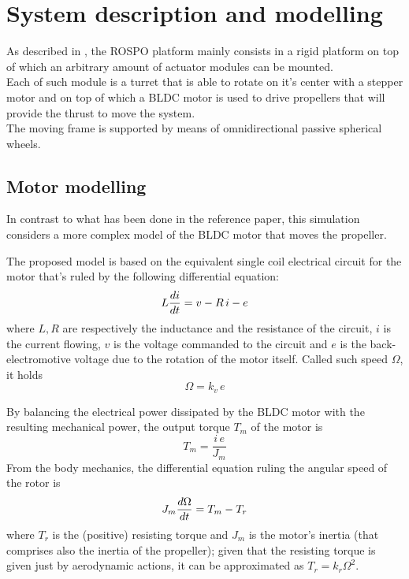\section{System description and modelling} \label{sec:description}

As described in \cite{rospo}, the ROSPO platform mainly consists in a rigid platform on top of which an arbitrary amount of actuator modules can be mounted. \\
Each of such module is a turret that is able to rotate on it's center with a stepper motor and on top of which a BLDC motor is used to drive propellers that will provide the thrust to move the system. \\
The moving frame is supported by means of omnidirectional passive spherical wheels.

\subsection{Motor modelling}
In contrast to what has been done in the reference paper, this simulation considers a more complex model of the BLDC motor that moves the propeller.

The proposed model is based on the equivalent single coil electrical circuit for the motor that's ruled by the following differential equation:
\begin{equation} \label{eq:singlecoil}
    L \diff{i} t = v - R\, i - e
\end{equation}
where $L, R$ are respectively the inductance and the resistance of the circuit, $i$ is the current flowing, $v$ is the voltage commanded to the circuit and $e$ is the back-electromotive voltage due to the rotation of the motor itself. Called such speed $\Omega$, it holds
\[ \Omega = k_{v} \, e \]

By balancing the electrical power dissipated by the BLDC motor with the resulting mechanical power, the output torque $T_{m}$ of the motor is
\[ T_{m} = \frac{i \, e}{J_{m}} \]
From the body mechanics, the differential equation ruling the angular speed of the rotor is
\begin{equation} \label{eq:rotordyn}
    J_{m} \diff{\Omega}{t} = T_{m} - T_{r}
\end{equation}
where $T_{r}$ is the (positive) resisting torque and $J_{m}$ is the motor's inertia (that comprises also the inertia of the propeller); given that the resisting torque is given just by aerodynamic actions, it can be approximated as $T_{r} = k_{r} \Omega^{2}$.

